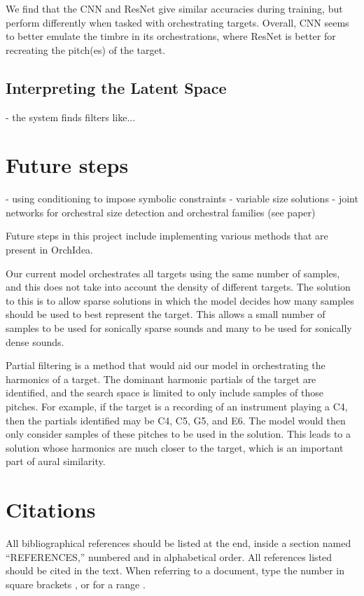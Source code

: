 \documentclass{article}
\begin{document}
We find that the CNN and ResNet give similar accuracies during training, but perform differently when tasked with orchestrating targets. Overall, CNN seems to better emulate the timbre in its orchestrations, where ResNet is better for recreating the pitch(es) of the target. 

\subsection{Interpreting the Latent Space}
- the system finds filters like...

\section{Future steps}
- using conditioning to impose symbolic constraints
- variable size solutions
- joint networks for orchestral size detection and orchestral families (see paper)

Future steps in this project include implementing various methods that are present in OrchIdea. 

Our current model orchestrates all targets using the same number of samples, and this does not take into account the density of different targets. The solution to this is to allow sparse solutions in which the model decides how many samples should be used to best represent the target. This allows a small number of samples to be used for sonically sparse sounds and many to be used for sonically dense sounds. 

Partial filtering is a method that would aid our model in orchestrating the harmonics of a target. The dominant harmonic partials of the target are identified, and the search space is limited to only include samples of those pitches. For example, if the target is a recording of an instrument playing a C4, then the partials identified may be C4, C5, G5, and E6. The model would then only consider samples of these pitches to be used in the solution. This leads to a solution whose harmonics are much closer to the target, which is an important part of aural similarity.

\section{Citations}

All bibliographical references should be listed at the end,
inside a section named ``REFERENCES,'' numbered and in alphabetical order.
All references listed should be cited in the text.
When referring to a document, type the number in square brackets
\cite{Author:00}, or for a range \cite{Author:00,Someone:10,Someone:04}.
\end{document}
